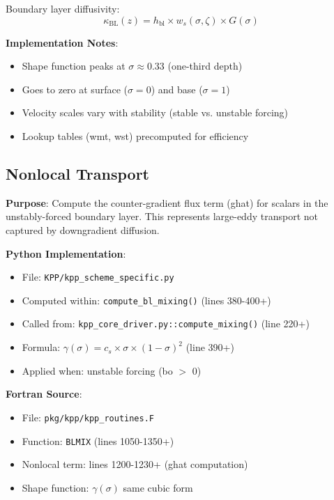 \documentclass[11pt]{article}
\begin{document}
Boundary layer diffusivity:
\begin{equation}
\kappa_{\text{BL}}(z) = h_{\text{bl}} \times w_s(\sigma, \zeta) \times G(\sigma)
\end{equation}

\textbf{Implementation Notes}:
\begin{itemize}
    \item Shape function peaks at $\sigma \approx 0.33$ (one-third depth)
    \item Goes to zero at surface ($\sigma = 0$) and base ($\sigma = 1$)
    \item Velocity scales vary with stability (stable vs. unstable forcing)
    \item Lookup tables (wmt, wst) precomputed for efficiency
\end{itemize}

\subsection{Nonlocal Transport}

\textbf{Purpose}: Compute the counter-gradient flux term (ghat) for scalars in the unstably-forced boundary layer. This represents large-eddy transport not captured by downgradient diffusion.

\textbf{Python Implementation}:
\begin{itemize}
    \item File: \verb|KPP/kpp_scheme_specific.py|
    \item Computed within: \verb|compute_bl_mixing()| (lines 380-400+)
    \item Called from: \verb|kpp_core_driver.py::compute_mixing()| (line 220+)
    \item Formula: $\gamma(\sigma) = c_s \times \sigma \times (1 - \sigma)^2$ (line 390+)
    \item Applied when: unstable forcing (bo $>$ 0)
\end{itemize}

\textbf{Fortran Source}:
\begin{itemize}
    \item File: \verb|pkg/kpp/kpp_routines.F|
    \item Function: \verb|BLMIX| (lines 1050-1350+)
    \item Nonlocal term: lines 1200-1230+ (ghat computation)
    \item Shape function: $\gamma(\sigma)$ same cubic form
\end{itemize}
\end{document}
